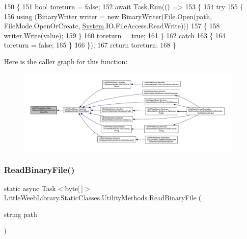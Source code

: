 \begin{DoxyCode}
150         \{
151             \textcolor{keywordtype}{bool} toreturn = \textcolor{keyword}{false};
152             await Task.Run(() =>
153             \{
154                 \textcolor{keywordflow}{try}
155                 \{
156                     \textcolor{keyword}{using} (BinaryWriter writer = \textcolor{keyword}{new} BinaryWriter(File.Open(path, FileMode.OpenOrCreate, 
      \mbox{\hyperlink{namespace_system}{System}}.IO.FileAccess.ReadWrite)))
157                     \{
158                         writer.Write(value);
159                     \}
160                     toreturn = \textcolor{keyword}{true};
161                 \}
162                 \textcolor{keywordflow}{catch}
163                 \{
164                     toreturn = \textcolor{keyword}{false};
165                 \}
166             \});
167             \textcolor{keywordflow}{return} toreturn;
168         \}
\end{DoxyCode}
Here is the caller graph for this function\+:\nopagebreak
\begin{figure}[H]
\begin{center}
\leavevmode
\includegraphics[width=350pt]{class_little_weeb_library_1_1_static_classes_1_1_utility_methods_a6542a3a6ea0aed6b4d78bb44a4a7d9d7_icgraph}
\end{center}
\end{figure}
\mbox{\label{class_little_weeb_library_1_1_static_classes_1_1_utility_methods_a7b5de7a3ecc749b655fc3ed2af55360b}} 
\subsubsection{\texorpdfstring{Read\+Binary\+File()}{ReadBinaryFile()}}
{\footnotesize\ttfamily static async Task$<$byte\mbox{[}$\,$\mbox{]}$>$ Little\+Weeb\+Library.\+Static\+Classes.\+Utility\+Methods.\+Read\+Binary\+File (\begin{DoxyParamCaption}\item[{string}]{path }\end{DoxyParamCaption})\hspace{0.3cm}{\ttfamily [static]}}



